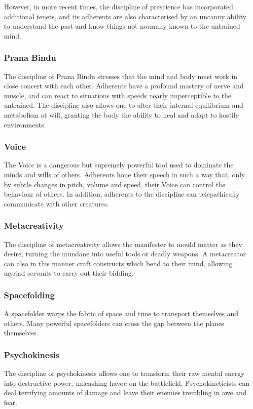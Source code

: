 However, in more recent times,
the discipline of prescience has incorporated additional tenets,
and its adherents are also characterised by an uncanny ability to
understand the past and know things not normally known to
the untrained mind.

\subsubsection{Prana Bindu}
The discipline of Prana Bindu stresses that the mind and body
must work in close concert with each other.
Adherents have a profound mastery of nerve and muscle,
and can react to situations with speeds nearly imperceptible
to the untrained.
The discipline also allows one to alter their internal equilibrium
and metabolism at will,
granting the body the ability to heal and adapt to hostile environments.

\subsubsection{Voice}
The Voice is a dangerous but supremely powerful tool
used to dominate the minds and wills of others.
Adherents hone their speech in such a way that,
only by subtle changes in pitch, volume and speed,
their Voice can control the behaviour of others.
In addition, adherents to the discipline can telepathically
communicate with other creatures.

\subsubsection{Metacreativity}
The discipline of metacreativity allows the manifester to mould
matter as they desire,
turning the mundane into useful tools or deadly weapons.
A metacreator can also in this manner craft constructs
which bend to their mind,
allowing myriad servants to carry out their bidding.

\subsubsection{Spacefolding}
A spacefolder warps the fabric of space and time to
transport themselves and others.
Many powerful spacefolders can cross the gap between
the planes themselves.

\subsubsection{Psychokinesis}
The discipline of psychokinesis allows one to transform
their raw mental energy into destructive power,
unleashing havoc on the battlefield.
Psychokineticists can deal terrifying amounts of damage
and leave their enemies trembling in awe and fear.

